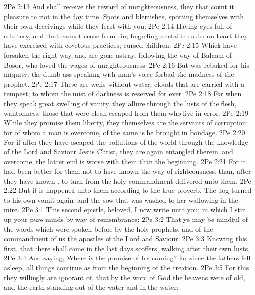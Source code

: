 \vs 2Pe 2:13 And shall receive the reward of unrighteousness,  they that count it pleasure to riot in the day time. Spots  and blemishes, sporting themselves with their own deceivings while they feast with you;
\vs 2Pe 2:14 Having eyes full of adultery, and that cannot cease from sin; beguiling unstable souls: an heart they have exercised with covetous practices; cursed children:
\vs 2Pe 2:15 Which have forsaken the right way, and are gone astray, following the way of Balaam  of Bosor, who loved the wages of unrighteousness;
\vs 2Pe 2:16 But was rebuked for his iniquity: the dumb ass speaking with man's voice forbad the madness of the prophet.
\vs 2Pe 2:17 These are wells without water, clouds that are carried with a tempest; to whom the mist of darkness is reserved for ever.
\vs 2Pe 2:18 For when they speak great swelling  of vanity, they allure through the lusts of the flesh,  wantonness, those that were clean escaped from them who live in error.
\vs 2Pe 2:19 While they promise them liberty, they themselves are the servants of corruption: for of whom a man is overcome, of the same is he brought in bondage.
\vs 2Pe 2:20 For if after they have escaped the pollutions of the world through the knowledge of the Lord and Saviour Jesus Christ, they are again entangled therein, and overcome, the latter end is worse with them than the beginning.
\vs 2Pe 2:21 For it had been better for them not to have known the way of righteousness, than, after they have known , to turn from the holy commandment delivered unto them.
\vs 2Pe 2:22 But it is happened unto them according to the true proverb, The dog  turned to his own vomit again; and the sow that was washed to her wallowing in the mire.
\vs 2Pe 3:1 This second epistle, beloved, I now write unto you; in  which I stir up your pure minds by way of remembrance:
\vs 2Pe 3:2 That ye may be mindful of the words which were spoken before by the holy prophets, and of the commandment of us the apostles of the Lord and Saviour:
\vs 2Pe 3:3 Knowing this first, that there shall come in the last days scoffers, walking after their own lusts,
\vs 2Pe 3:4 And saying, Where is the promise of his coming? for since the fathers fell asleep, all things continue as  from the beginning of the creation.
\vs 2Pe 3:5 For this they willingly are ignorant of, that by the word of God the heavens were of old, and the earth standing out of the water and in the water:
